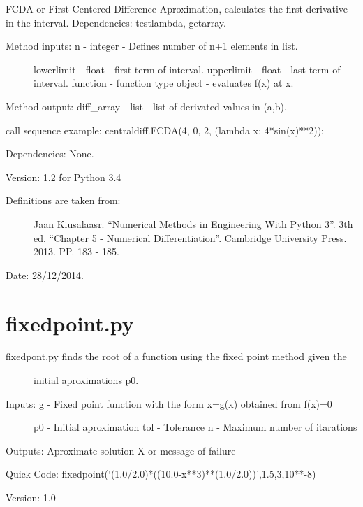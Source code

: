 \documentclass[letterpaper,10pt,oneside]{sphinxmanual}
\theoremstyle{plain}%
\theoremstyle{definition}%
\theoremstyle{remark}%
\begin{document}
FCDA or First Centered Difference Aproximation, calculates the first
derivative in the interval. Dependencies: testlambda, getarray.
\begin{description}
\item[{Method inputs: n - integer - Defines number of n+1 elements in list.}] \leavevmode
lowerlimit - float - first term of interval.
upperlimit - float - last term of interval.
function - function type object - evaluates f(x) at x.

\end{description}

Method output: diff\_array - list - list of derivated values in (a,b).

call sequence example: centraldiff.FCDA(4, 0, 2, (lambda x: 4*sin(x)**2));

Dependencies: None.

Version: 1.2 for Python 3.4
\begin{description}
\item[{Definitions are taken from:}] \leavevmode
Jaan Kiusalaasr. ``Numerical Methods in Engineering With Python 3''.
3th ed. ``Chapter 5 - Numerical Differentiation''. 
Cambridge University Press. 2013. PP. 183 - 185.

\end{description}




Date: 28/12/2014.


\section{fixedpoint.py}
\label{code:module-fixedpoint}\label{code:fixedpoint-py}\begin{description}
\item[{fixedpont.py finds the root of a function using the fixed point method given the}] \leavevmode
initial aproximations p0.

\item[{Inputs: g - Fixed point function with the form x=g(x) obtained from f(x)=0}] \leavevmode
p0 - Initial aproximation
tol - Tolerance
n - Maximum number of itarations

\end{description}

Outputs: Aproximate solution X or message of failure

Quick Code: fixedpoint(`(1.0/2.0)*((10.0-x**3)**(1.0/2.0))',1.5,3,10**-8)

Version: 1.0
\end{document}
